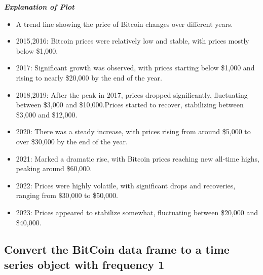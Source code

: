 \documentclass[
]{book}
\newenvironment{Shaded}{\begin{snugshade}}{\end{snugshade}}
\newcommand{\AttributeTok}[1]{\textcolor[rgb]{0.13,0.29,0.53}{#1}}
\newcommand{\CommentTok}[1]{\textcolor[rgb]{0.56,0.35,0.01}{\textit{#1}}}
\newcommand{\DecValTok}[1]{\textcolor[rgb]{0.00,0.00,0.81}{#1}}
\newcommand{\FunctionTok}[1]{\textcolor[rgb]{0.13,0.29,0.53}{\textbf{#1}}}
\newcommand{\NormalTok}[1]{#1}
\newcommand{\OtherTok}[1]{\textcolor[rgb]{0.56,0.35,0.01}{#1}}
\newcommand{\SpecialCharTok}[1]{\textcolor[rgb]{0.81,0.36,0.00}{\textbf{#1}}}
\newcommand{\StringTok}[1]{\textcolor[rgb]{0.31,0.60,0.02}{#1}}
\providecommand{\tightlist}{%
  \setlength{\itemsep}{0pt}\setlength{\parskip}{0pt}}
\begin{document}
\emph{\textbf{Explanation of Plot}}

\begin{itemize}
\tightlist
\item
  A trend line showing the price of Bitcoin changes over different years.
\item
  2015,2016: Bitcoin prices were relatively low and stable, with prices mostly below \$1,000.
\item
  2017: Significant growth was observed, with prices starting below \$1,000 and rising to nearly \$20,000 by the end of the year.
\item
  2018,2019: After the peak in 2017, prices dropped significantly, fluctuating between \$3,000 and \$10,000.Prices started to recover, stabilizing between \$3,000 and \$12,000.
\item
  2020: There was a steady increase, with prices rising from around \$5,000 to over \$30,000 by the end of the year.
\item
  2021: Marked a dramatic rise, with Bitcoin prices reaching new all-time highs, peaking around \$60,000.
\item
  2022: Prices were highly volatile, with significant drops and recoveries, ranging from \$30,000 to \$50,000.
\item
  2023: Prices appeared to stabilize somewhat, fluctuating between \$20,000 and \$40,000.
\end{itemize}

\subsection*{Convert the BitCoin data frame to a time series object with frequency 1}\label{convert-the-bitcoin-data-frame-to-a-time-series-object-with-frequency-1}

\begin{Shaded}
\end{Shaded}
\end{document}
